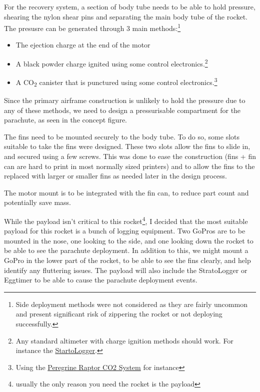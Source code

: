 \documentclass[11pt]{article}
\begin{document}
For the recovery system, a section of body tube needs to be able to hold pressure, shearing the nylon shear pins and separating the main body tube of the rocket. The presusre can be generated through 3 main methods:\footnote{Side deployment methods were not considered as they are fairly uncommon and present significant risk of zippering the rocket or not deploying successfully.}
\begin{itemize}
\item The ejection charge at the end of the motor
\item A black powder charge ignited using some control electronics.\footnote{Any standard altimeter with charge ignition methods should work. For instance the \href{http://www.perfectflite.com/SLCF.html}{StartoLogger}.}
\item A CO\textsubscript{2} canister that is punctured using some control electronics.\footnote{Using the \href{https://fruitychutes.com/buyachute/co2-ejection-system-c-20/peregrine-raptor-co2-system-kit-23-to-45-gram-p-183.html}{Peregrine Raptor CO2 System} for instance}
\end{itemize}

Since the primary airframe construction is unlikely to  hold the pressure due to any of these methods, we need to design a pressurisable compartment for the parachute, as seen in the concept figure. 

The fins need to be mounted securely to the body tube. To do so, some slots suitable to take the fins were designed. These two slots allow the fins to slide in, and secured using a few screws. This was done to ease the construction (fins + fin can are hard to print in most normally sized printers) and to allow the fins to the replaced with larger or smaller fins as needed later in the design process. 

The motor mount is to be integrated with the fin can, to reduce part count and potentially save mass. 


While the payload isn't critical to this rocket\footnote{usually the only reason you need the rocket is the payload}, I decided that the most suitable payload for this rocket is a bunch of logging equipment. Two GoPros are to be mounted in the nose, one looking to the side, and one looking down the rocket to be able to see the parachute deployment. In addition to this, we might mount a GoPro in the lower part of the rocket, to be able to see the fins clearly, and help identify any fluttering issues. The payload will also include the StratoLogger or Eggtimer to be able to cause the parachute deployment events.
\end{document}
